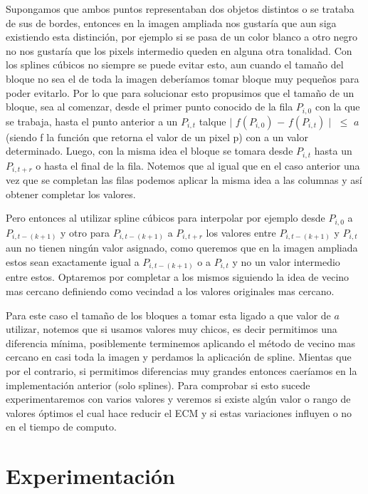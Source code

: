 \documentclass[a4paper]{article}
\newcounter{col}
\begin{document}
Supongamos que ambos puntos representaban dos objetos distintos o se trataba de sus de bordes, entonces en la imagen ampliada nos gustaría que aun siga existiendo esta distinción, por ejemplo si se pasa de un color blanco a otro negro no nos gustaría que los pixels intermedio queden en alguna otra tonalidad. Con los splines cúbicos no siempre se puede evitar esto, aun cuando el tamaño del bloque no sea el de toda la imagen deberíamos tomar bloque muy pequeños para poder evitarlo. Por lo que para solucionar esto propusimos que el tamaño de un bloque, sea al comenzar, desde el primer punto conocido de la fila $P_{i,0}$ con la que se trabaja,  hasta el punto anterior a un $P_{i, t}$ talque  $\mid $  $f(P_{i,0})$  $- $ $f(P_{i, t}) \mid$ $\leqslant$ $a$ (siendo f la función que retorna el valor de un pixel p) con a un valor determinado. Luego, con la misma idea el bloque se tomara desde $P_{i, t}$ hasta un $P_{i, t+r}$ o hasta el final de la fila. Notemos que al igual que en el caso anterior una vez que se completan las filas podemos aplicar la misma idea a las columnas y así obtener completar los valores. 

Pero entonces al utilizar spline cúbicos para interpolar por ejemplo desde $P_{i,0}$ a $P_{i, t - (k+1)}$ y otro para $P_{i, t - (k+1)}$ a $P_{i, t+r}$ los valores entre $P_{i, t - (k+1)}$ y $P_{i, t}$ aun no tienen ningún valor asignado, como queremos que en la imagen ampliada estos sean exactamente igual a $P_{i, t - (k+1)}$ o a $P_{i, t}$ y no un valor intermedio entre estos. Optaremos por completar a los mismos siguiendo la idea de vecino mas cercano definiendo como vecindad a los valores originales mas cercano.

Para este caso el tamaño de los bloques a tomar esta ligado a que valor de $a$ utilizar, notemos que si usamos valores muy chicos, es decir permitimos una diferencia mínima, posiblemente terminemos aplicando el método de vecino mas cercano en casi toda la imagen y perdamos la aplicación de spline. Mientas que por el contrario, si permitimos diferencias muy grandes entonces caeríamos en la implementación anterior (solo splines). Para comprobar si esto sucede experimentaremos con varios valores y veremos si existe algún valor o rango de valores óptimos el cual hace reducir el ECM y si estas variaciones influyen o no en el tiempo de computo.



\section{Experimentación}
\end{document}
